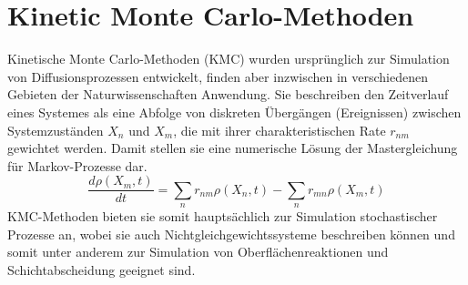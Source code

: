 \section{Kinetic Monte Carlo-Methoden}
\label{kmc}

Kinetische Monte Carlo-Methoden (KMC)\cite{voter_introduction_2007} wurden ursprünglich zur Simulation von Diffusionsprozessen entwickelt, finden aber inzwischen in verschiedenen Gebieten der Naturwissenschaften Anwendung\cite{yang_kinetic_2008,nielsen_parallel_2013,gosalvez_atomistic_2008}.
Sie beschreiben den Zeitverlauf eines Systemes als eine Abfolge von diskreten Übergängen (Ereignissen) zwischen Systemzuständen $X_n$ und $X_m$, die mit ihrer charakteristischen Rate $r_{n m}$ gewichtet werden.
Damit stellen sie eine numerische Lösung der Mastergleichung für Markov-Prozesse dar.
\begin{equation}
  \frac{d \rho(X_m,t)}{d t} = \sum_n{r_{n m}\rho(X_n,t) - \sum_n{r_{m n}\rho(X_m,t)}}
\end{equation}
KMC-Methoden bieten sie somit hauptsächlich zur Simulation stochastischer Prozesse an, wobei sie auch Nichtgleichgewichtssysteme beschreiben können und somit unter anderem zur Simulation von Oberflächenreaktionen und Schichtabscheidung geeignet sind\cite{battaile_kinetic_2008}.

